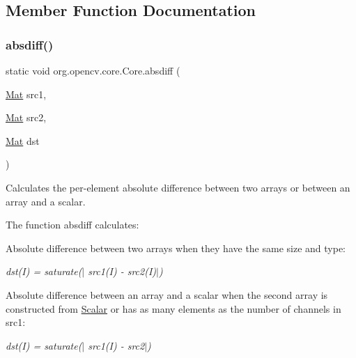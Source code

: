 \subsection{Member Function Documentation}
\mbox{\label{classorg_1_1opencv_1_1core_1_1_core_a7ca624705224f143de9fea745ae576d0}} 
\subsubsection{\texorpdfstring{absdiff()}{absdiff()}\hspace{0.1cm}{\footnotesize\ttfamily [1/2]}}
{\footnotesize\ttfamily static void org.\+opencv.\+core.\+Core.\+absdiff (\begin{DoxyParamCaption}\item[{\mbox{\hyperlink{classorg_1_1opencv_1_1core_1_1_mat}{Mat}}}]{src1,  }\item[{\mbox{\hyperlink{classorg_1_1opencv_1_1core_1_1_mat}{Mat}}}]{src2,  }\item[{\mbox{\hyperlink{classorg_1_1opencv_1_1core_1_1_mat}{Mat}}}]{dst }\end{DoxyParamCaption})\hspace{0.3cm}{\ttfamily [static]}}

Calculates the per-\/element absolute difference between two arrays or between an array and a scalar.

The function {\ttfamily absdiff} calculates\+:


\begin{DoxyItemize}
\item Absolute difference between two arrays when they have the same size and type\+: 
\end{DoxyItemize}

{\itshape dst(\+I) = saturate($\vert$ src1(\+I) -\/ src2(\+I)$\vert$)}


\begin{DoxyItemize}
\item Absolute difference between an array and a scalar when the second array is constructed from {\ttfamily \mbox{\hyperlink{classorg_1_1opencv_1_1core_1_1_scalar}{Scalar}}} or has as many elements as the number of channels in {\ttfamily src1}\+: 
\end{DoxyItemize}

{\itshape dst(\+I) = saturate($\vert$ src1(\+I) -\/ src2$\vert$)}


